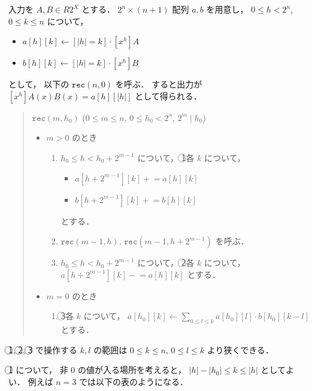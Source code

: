 \documentclass{jsarticle}
\newcommand{\abs}[1]{\lvert #1 \rvert}
\newcommand{\minuseq}{\mathrel{-}=}
\newcommand{\pluseq}{\mathrel{+}=}
\begin{document}
入力を $A, B \in R 2^X$ とする．
$2^n \times (n+1)$ 配列 $a, b$ を用意し，
$0 \le h < 2^n$, $0 \le k \le n$ について，
\begin{itemize}
  \item $a[h][k] \gets [\abs{h} = k] \cdot [x^h] A$
  \item $b[h][k] \gets [\abs{h} = k] \cdot [x^h] B$
\end{itemize}
として，
以下の $\mathtt{rec}(n, 0)$ を呼ぶ．
すると出力が $[x^h] A(x) B(x) = a[h][\abs{h}]$ として得られる．
\begin{quote}
  $\mathtt{rec}(m, h_0)$ ($0 \le m \le n$, $0 \le h_0 < 2^n$, $2^m \mid h_0$)
  \begin{itemize}
    \item $m > 0$ のとき
      \begin{enumerate}
        \item $h_0 \le h < h_0 + 2^{m-1}$ について，
          \textcircled{1}各 $k$ について，
          \begin{itemize}
            \item $a[h + 2^{m-1}][k] \pluseq a[h][k]$
            \item $b[h + 2^{m-1}][k] \pluseq b[h][k]$
          \end{itemize}
          とする．
        \item $\mathtt{rec}(m-1, h)$, $\mathtt{rec}(m-1, h + 2^{m-1})$ を呼ぶ．
        \item $h_0 \le h < h_0 + 2^{m-1}$ について，
          \textcircled{2}各 $k$ について，
          $a[h + 2^{m-1}][k] \minuseq a[h][k]$ とする．
      \end{enumerate}
    \item $m = 0$ のとき
      \begin{enumerate}
      \item \textcircled{3}各 $k$ について，
        $a[h_0][k] \gets \sum_{0\le l\le k} a[h_0][l] \cdot b[h_0][k-l]$ とする．
      \end{enumerate}
  \end{itemize}
\end{quote}

\textcircled{1}, \textcircled{2}, \textcircled{3} で操作する $k, l$ の範囲は
$0 \le k \le n$, $0 \le l \le k$ より狭くできる．

\textcircled{1} について，
非 $0$ の値が入る場所を考えると，
$\abs{h} - \abs{h_0} \le k \le \abs{h}$ としてよい．
例えば $n = 3$ では以下の表のようになる．
\end{document}

